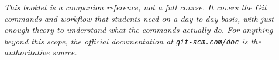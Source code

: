 \cleardoublepage
\thispagestyle{empty}
\vspace*{\fill}
\begin{center}
\begin{minipage}{0.78\textwidth}
\small\itshape
This booklet is a companion reference, not a full course. It covers the
Git commands and \GitHub{} workflow that students need on a day-to-day
basis, with just enough theory to understand what the commands actually
do. For anything beyond this scope, the official documentation at
\texttt{git-scm.com/doc} is the authoritative source.
\end{minipage}
\end{center}
\vspace*{\fill}
\cleardoublepage
